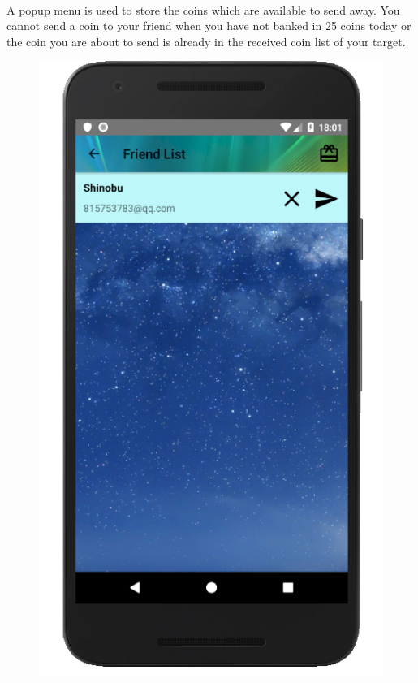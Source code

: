 \documentclass[12pt]{article}
\begin{document}
\paragraph{}
A popup menu is used to store the coins which are available to send away. You cannot send a coin to your friend when you have not banked in 25 coins today or the coin you are about to send is already in the received coin list of your target.
\begin{figure}
	\centering
	\includegraphics[scale=0.25]{Friend.png}

\end{figure}
\end{document}
